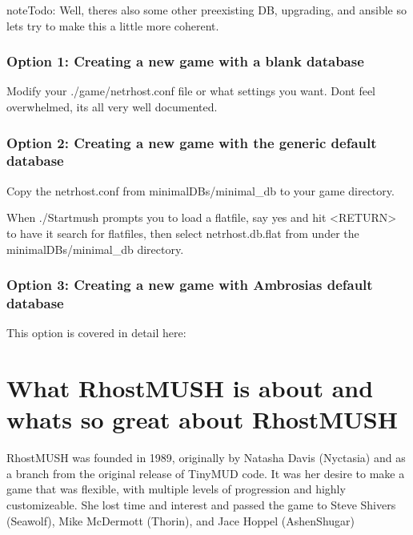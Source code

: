 \documentclass[letterpaper,10pt,english]{sphinxmanual}
\begin{document}
\begin{sphinxadmonition}{note}{\label{\detokenize{install:id9}}Todo:}
\sphinxAtStartPar
Well, there\textquotesingle{}s also some other pre\sphinxhyphen{}existing DB, upgrading, and ansible so let\textquotesingle{}s try to make this a little more coherent.
\end{sphinxadmonition}


\subsection{Option 1: Creating a new game with a blank database}
\label{\detokenize{install:option-1-creating-a-new-game-with-a-blank-database}}
\sphinxAtStartPar
Modify your ./game/netrhost.conf file or what settings you want.
Don\textquotesingle{}t feel overwhelmed, it\textquotesingle{}s all very well documented.


\subsection{Option 2: Creating a new game with the generic default database}
\label{\detokenize{install:option-2-creating-a-new-game-with-the-generic-default-database}}
\sphinxAtStartPar
Copy the netrhost.conf from minimal\sphinxhyphen{}DBs/minimal\_db to your game directory.

\sphinxAtStartPar
When ./Startmush prompts you to load a flatfile, say \textquotesingle{}yes\textquotesingle{} and hit \textless{}RETURN\textgreater{}
to have it search for flatfiles, then select netrhost.db.flat from under
the minimal\sphinxhyphen{}DBs/minimal\_db directory.


\subsection{Option 3: Creating a new game with Ambrosia\textquotesingle{}s default database}
\label{\detokenize{install:option-3-creating-a-new-game-with-ambrosia-s-default-database}}
\sphinxAtStartPar
This option is covered in detail here: {\hyperref[\detokenize{ambrosiadb:ambrosiadb-installation}]{}}


\chapter{What RhostMUSH is about and what\textquotesingle{}s so great about RhostMUSH}
\label{\detokenize{features:what-rhostmush-is-about-and-what-s-so-great-about-rhostmush}}\label{\detokenize{features::doc}}
\sphinxAtStartPar
RhostMUSH was founded in 1989, originally by Natasha Davis (Nyctasia) and as
a branch from the original release of TinyMUD code.  It was her desire to make
a game that was flexible, with multiple levels of progression and highly
customizeable.  She lost time and interest and passed the game to
Steve Shivers (Seawolf), Mike McDermott (Thorin), and Jace Hoppel (Ashen\sphinxhyphen{}Shugar)
\end{document}
